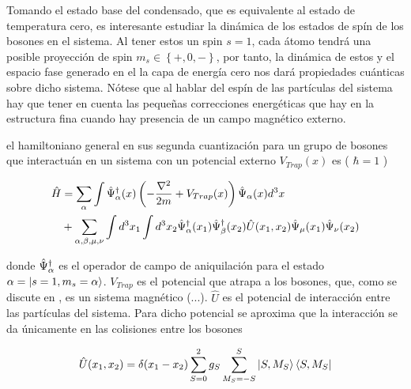 
Tomando el estado base del condensado, que es equivalente al estado de temperatura cero, es interesante estudiar la dinámica de los estados de spín de los bosones en el sistema. Al tener estos un spin $s = 1$, cada átomo tendrá una posible proyección de spin $m_s \in \left\lbrace +,0,- \right\rbrace$, por tanto, la dinámica de estos y el espacio fase generado en el la capa de energía cero nos dará propiedades cuánticas sobre dicho sistema. Nótese que al hablar del espín de las partículas del sistema hay que tener en cuenta las pequeñas correcciones energéticas que hay en la estructura fina cuando hay presencia de un campo magnético externo.

el hamiltoniano general en sus segunda cuantización para un grupo de bosones que interactuán en un sistema con un potencial externo $V_{Trap}(x)$ es ( $ \hbar = 1$ )

\begin{equation}
\begin{split}
\hat{H} & = \sum_{\alpha} \int \hat{\Psi}^{\dagger}_\alpha(x) \left( -\frac{\nabla^2}{2m} + V_{Trap}(x) \right) \hat{\Psi}_{\alpha}(x) d^3x \\ 
& + \sum_{\alpha,\beta, \mu, \nu} \int d^3x_1 \int d^3x_2  	\hat{\Psi}^{\dagger}_\alpha(x_1) \hat{\Psi}^{\dagger}_\beta(x_2) \hat{U}(x_1,x_2) \hat{\Psi}_{\mu}(x_1) \hat{\Psi}_{\nu}(x_2)
\end{split}
\label{gen_ham}
\end{equation}


donde $\hat{\Psi}^{\dagger}_\alpha$ es el operador de campo de aniquilación para el estado $\alpha = \left|s=1,m_s=\alpha\right\rangle$. $V_{Trap}$ es el potencial que atrapa a los bosones, que, como se discute en \cite{trap}, es un sistema magnético (...).
$\hat{U}$ es el potencial de interacción entre las partículas del sistema. Para dicho potencial se aproxima que la interacción se da únicamente en las colisiones entre los bosones \cite{potential}

\begin{equation}
\hat{U}(x_1,x_2) = \delta{(x_1 - x_2)} \sum_{S=0}^2 g_S \sum_{M_S=-S}^S \left|S,M_S\right\rangle\left\langle S,M_S\right|
\label{pseudopot}
\end{equation}


